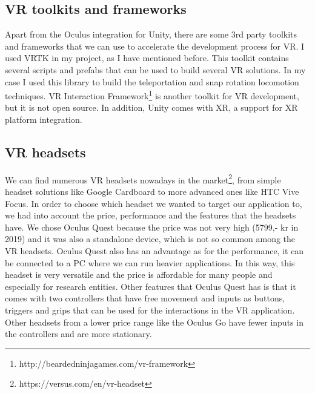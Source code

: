 \subsection{VR toolkits and frameworks}
Apart from the Oculus integration for Unity, there are some 3rd party toolkits and frameworks that we can use to accelerate the development process for VR. I used VRTK in my project, as I have mentioned before. This toolkit contains several scripts and prefabs that can be used to build several VR solutions. In my case I used this library to build the teleportation and snap rotation locomotion techniques. VR Interaction Framework\footnote{http://beardedninjagames.com/vr-framework} is another toolkit for VR development, but it is not open source. In addition, Unity comes with XR, a support for XR platform integration.

\subsection{VR headsets}
We can find numerous VR headsets nowadays in the market\footnote{https://versus.com/en/vr-headset}, from simple headset solutions like Google Cardboard to more advanced ones like HTC Vive Focus. In order to choose which headset we wanted to target our application to, we had into account the price, performance and the features that the headsets have. We chose Oculus Quest because the price was not very high (5799,- kr in 2019) and it was also a standalone device, which is not so common among the VR headsets. Oculus Quest also has an advantage as for the performance, it can be connected to a PC where we can run heavier applications. In this way, this headset is very versatile and the price is affordable for many people and especially for research entities. Other features that Oculus Quest has is that it comes with two controllers that have free movement and inputs as buttons, triggers and grips that can be used for the interactions in the VR application. Other headsets from a lower price range like the Oculus Go have fewer inputs in the controllers and are more stationary.
